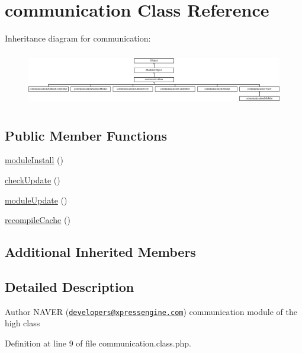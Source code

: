 \hypertarget{classcommunication}{\section{communication Class Reference}
\label{classcommunication}
}
Inheritance diagram for communication\-:\begin{figure}[H]
\begin{center}
\leavevmode
\includegraphics[height=2.405498cm]{classcommunication}
\end{center}
\end{figure}
\subsection*{Public Member Functions}
\begin{DoxyCompactItemize}
\item 
\hyperlink{classcommunication_aa976c35c62e0e28be160893825f4e7a6}{module\-Install} ()
\item 
\hyperlink{classcommunication_a76f080661ce31bd72c02bb41c8d5714f}{check\-Update} ()
\item 
\hyperlink{classcommunication_a10cbff2a979531d279954a22b8455061}{module\-Update} ()
\item 
\hyperlink{classcommunication_a79303a25f2f20a3bdd40f6af4b8f9a52}{recompile\-Cache} ()
\end{DoxyCompactItemize}
\subsection*{Additional Inherited Members}


\subsection{Detailed Description}
\begin{DoxyAuthor}{Author}
N\-A\-V\-E\-R (\href{mailto:developers@xpressengine.com}{\tt developers@xpressengine.\-com}) communication module of the high class 
\end{DoxyAuthor}


Definition at line 9 of file communication.\-class.\-php.



